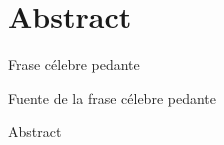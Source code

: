 %
%
%
%
%

\chapter{Abstract}

\begin{FraseCelebre}
\begin{Frase}
Frase célebre pedante
\end{Frase}
\begin{Fuente}
Fuente de la frase célebre pedante
\end{Fuente}
\end{FraseCelebre}

Abstract

\endinput

